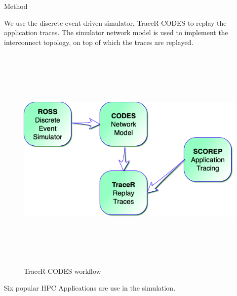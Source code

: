 \documentclass[final]{beamer}
\begin{document}
\begin{frame}[t]
\begin{columns}[t]
\begin{column}{0.2\textwidth}
\begin{block}{Method}
\begin{itemize}
        We use the discrete event driven simulator, TraceR-CODES\cite{b4} to replay the application traces. The simulator network model is used to implement the interconnect topology, on top of which the traces are replayed.
        \newline
        \newline
        \newline
            \begin{figure}[H]
            \centering
            \includegraphics[width=18cm, height=11.25cm]{figs/Tracer.png}
            \caption{TraceR-CODES workflow}
            \end{figure}
        \vspace{-1cm}
        
        Six popular HPC Applications are use in the simulation.
        \begin{table}
        

\end{table}
\end{itemize}
\end{block}
\end{column}
\end{columns}
\end{frame}
\end{document}
